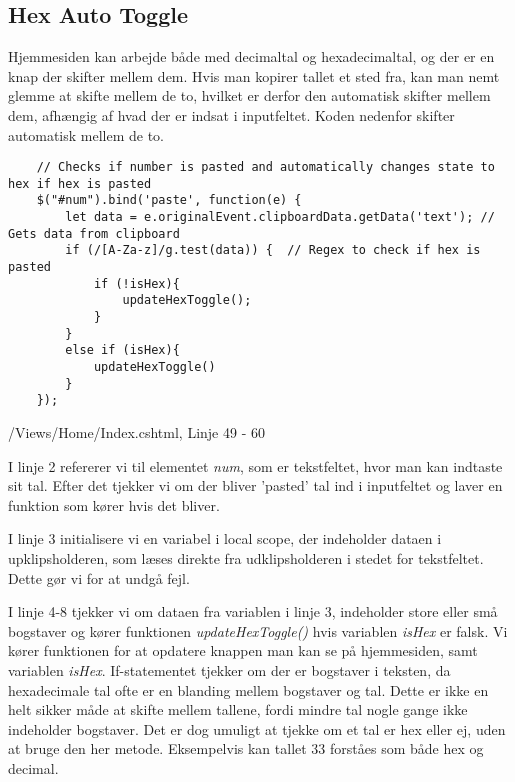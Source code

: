 \documentclass[a4paper,12pt]{extarticle}
\begin{document}
    \subsection{Hex Auto Toggle}

    Hjemmesiden kan arbejde både med decimaltal og hexadecimaltal, og der er en knap der skifter mellem dem.
    Hvis man kopirer tallet et sted fra, kan man nemt glemme at skifte mellem de to, hvilket er derfor den automatisk
    skifter mellem dem, afhængig af hvad der er indsat i inputfeltet.
    Koden nedenfor skifter automatisk mellem de to.

    \begin{listing}[!ht]
        \begin{verbatim}
    // Checks if number is pasted and automatically changes state to hex if hex is pasted
    $("#num").bind('paste', function(e) {
        let data = e.originalEvent.clipboardData.getData('text'); // Gets data from clipboard
        if (/[A-Za-z]/g.test(data)) {  // Regex to check if hex is pasted
            if (!isHex){
                updateHexToggle();
            }
        }
        else if (isHex){
            updateHexToggle()
        }
    });
        \end{verbatim}
        \caption{/Views/Home/Index.cshtml, Linje 49 - 60}
    \end{listing}

    \medskip

    I linje 2 refererer vi til elementet \emph{num}, som er tekstfeltet, hvor man kan indtaste sit tal.
    Efter det tjekker vi om der bliver 'pasted' tal ind i inputfeltet og laver en funktion som kører hvis det bliver.

    \medskip

    I linje 3 initialisere vi en variabel i local scope, der indeholder dataen i upklipsholderen, som læses direkte fra udklipsholderen i stedet for tekstfeltet.
    Dette gør vi for at undgå fejl.

    \medskip

    I linje 4-8 tjekker vi om dataen fra variablen i linje 3, indeholder store eller små bogstaver og kører funktionen \emph{updateHexToggle()} hvis variablen \emph{isHex} er falsk.
    Vi kører funktionen for at opdatere knappen man kan se på hjemmesiden, samt variablen \emph{isHex}.
    If-statementet tjekker om der er bogstaver i teksten, da hexadecimale tal ofte er en blanding mellem bogstaver og tal.
    Dette er ikke en helt sikker måde at skifte mellem tallene, fordi mindre tal nogle gange ikke indeholder bogstaver.
    Det er dog umuligt at tjekke om et tal er hex eller ej, uden at bruge den her metode. Eksempelvis kan tallet 33 forståes som både hex og decimal.
\end{document}
